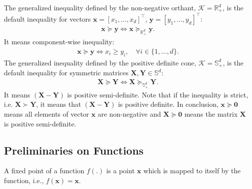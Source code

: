 \documentclass[lang=cn,10pt]{gorgeousnbook}
\numberwithin{equation}{section}%
\numberwithin{figure}{section}%
\begin{document}
\begin{definition}\label{definition_generalized_inequality_examples}
The generalized inequality defined by the non-negative orthant, $\mathcal{K} = \mathbb{R}_+^d$, is the default inequality for vectors $\boldsymbol{x} = [x_1, \dots, x_d]^\top$, $\boldsymbol{y} = [y_1, \dots, y_d]^\top$:
\begin{align*}
\boldsymbol{x} \succeq \boldsymbol{y} \iff \boldsymbol{x} \succeq_{\mathbb{R}_+^d} \boldsymbol{y}.
\end{align*}
It means component-wise inequality:
\begin{align*}
\boldsymbol{x} \succeq \boldsymbol{y} \iff x_i \geq y_i, \quad \forall i \in \{1, \dots, d\}.
\end{align*}
The generalized inequality defined by the positive definite cone, $\mathcal{K} = \mathbb{S}_+^d$, is the default inequality for symmetric matrices $\boldsymbol{X}, \boldsymbol{Y} \in \mathbb{S}^d$:
\begin{align*}
\boldsymbol{X} \succeq \boldsymbol{Y} \iff \boldsymbol{X} \succeq_{\mathbb{S}_+^d} \boldsymbol{Y}.
\end{align*}
It means $(\boldsymbol{X} - \boldsymbol{Y})$ is positive semi-definite. Note that if the inequality is strict, i.e. $\boldsymbol{X} \succ \boldsymbol{Y}$, it means that $(\boldsymbol{X} - \boldsymbol{Y})$ is positive definite.
In conclusion, $\boldsymbol{x} \succeq \boldsymbol{0}$ means all elements of vector $\boldsymbol{x}$ are non-negative and $\boldsymbol{X} \succeq \boldsymbol{0}$ means the matrix $\boldsymbol{X}$ is positive semi-definite. 
\end{definition}

\subsection{Preliminaries on Functions}

\begin{definition}\label{definition_fixed_point}
A fixed point of a function $f(.)$ is a point $\boldsymbol{x}$ which is mapped to itself by the function, i.e., $f(\boldsymbol{x}) = \boldsymbol{x}$.
\end{definition}
\end{document}
